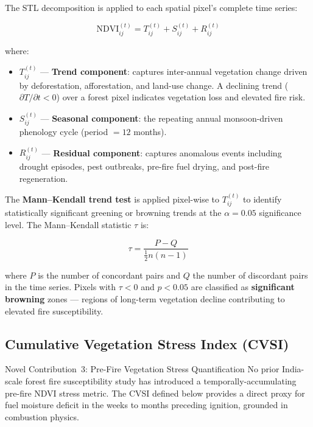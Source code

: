 \documentclass[12pt, a4paper]{article}
\begin{document}
The STL decomposition \citep{cleveland1990stl} is applied to each
spatial pixel's complete time series:

\begin{equation}
    \text{NDVI}_{ij}^{(t)} = T_{ij}^{(t)} + S_{ij}^{(t)} + R_{ij}^{(t)}
    \label{eq:stl}
\end{equation}

where:
\begin{itemize}
    \item $T_{ij}^{(t)}$ — \textbf{Trend component}: captures inter-annual
          vegetation change driven by deforestation, afforestation, and
          land-use change. A declining trend ($\partial T / \partial t < 0$)
          over a forest pixel indicates vegetation loss and elevated fire risk.
    \item $S_{ij}^{(t)}$ — \textbf{Seasonal component}: the repeating
          annual monsoon-driven phenology cycle (period $= 12$ months).
    \item $R_{ij}^{(t)}$ — \textbf{Residual component}: captures anomalous
          events including drought episodes, pest outbreaks, pre-fire fuel
          drying, and post-fire regeneration.
\end{itemize}

The \textbf{Mann--Kendall trend test} \citep{mann1945, kendall1975} is
applied pixel-wise to $T_{ij}^{(t)}$ to identify statistically significant
greening or browning trends at the $\alpha = 0.05$ significance level.
The Mann--Kendall statistic $\tau$ is:

\begin{equation}
    \tau = \frac{P - Q}{\frac{1}{2}n(n-1)}
    \label{eq:mk_tau}
\end{equation}

where $P$ is the number of concordant pairs and $Q$ the number of
discordant pairs in the time series. Pixels with $\tau < 0$ and
$p < 0.05$ are classified as \textbf{significant browning} zones —
regions of long-term vegetation decline contributing to elevated fire
susceptibility.

\subsection{Cumulative Vegetation Stress Index (CVSI)}
\label{sec:cvsi}

\begin{novelbox}{Novel Contribution~3: Pre-Fire Vegetation Stress Quantification}
No prior India-scale forest fire susceptibility study has introduced a
temporally-accumulating pre-fire NDVI stress metric. The CVSI defined
below provides a direct proxy for fuel moisture deficit in the weeks
to months preceding ignition, grounded in combustion physics.
\end{novelbox}
\end{document}
